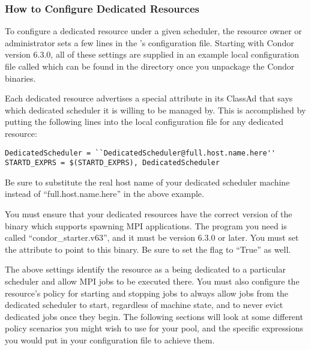 \subsubsection{\label{sec:Configure-Dedicated-Resource}
How to Configure Dedicated Resources} 

To configure a dedicated resource under a given scheduler, the
resource owner or administrator sets a few lines in the
's configuration file.
Starting with Condor version 6.3.0, all of these settings are supplied
in an example local configuration file called
 which can be found in
the  directory once you unpackage the Condor binaries.

Each dedicated resource advertises a special attribute in its ClassAd
that says which dedicated scheduler it is willing to be managed by.
This is accomplished by putting the following lines into the local
configuration file for any dedicated resource:

\begin{verbatim}
DedicatedScheduler = ``DedicatedScheduler@full.host.name.here''
STARTD_EXPRS = $(STARTD_EXPRS), DedicatedScheduler
\end{verbatim}

Be sure to substitute the real host name of your dedicated scheduler
machine instead of ``full.host.name.here'' in the above example. 

You must ensure that your dedicated resources have the correct version
of the  binary which supports spawning MPI
applications.
The program you need is called ``condor\_starter.v63'', and it must be
version 6.3.0 or later.
You must set the  attribute to point to
this binary.
Be sure to set the  flag to ``True'' as well.

The above settings identify the resource as a being dedicated to a
particular scheduler and allow MPI jobs to be executed there.
You must also configure the resource's policy for starting and
stopping jobs to always allow jobs from the dedicated scheduler to
start, regardless of machine state, and to never evict dedicated jobs
once they begin.
The following sections will look at some different policy scenarios
you might wish to use for your pool, and the specific expressions you
would put in your configuration file to achieve them.


